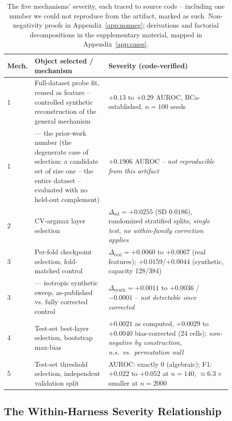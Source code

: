\documentclass{article}
\begin{document}
\begin{table}[t]
\centering
\small
{\setlength{\tabcolsep}{3pt}
\begin{tabular}{@{}p{0.04\linewidth}p{0.33\linewidth}p{0.55\linewidth}@{}}
\toprule
Mech. & Object selected / mechanism & Severity (code-verified) \\
\midrule
1 & Full-dataset probe fit, reused as feature -- controlled synthetic reconstruction of the general mechanism & $+0.13$ to $+0.29$ AUROC, BCa-established, $n{=}100$ seeds \\
1 & --- the prior-work number (the degenerate case of selection: a candidate set of size one -- the entire dataset -- evaluated with no held-out complement) & $+0.1906$ AUROC -- \emph{not reproducible from this artifact} \\
2 & CV-argmax layer selection & $\Delta_{\text{sel}}=+0.0255$ (SD $0.0186$), randomized stratified splits; \emph{single test, no within-family correction applies} \\
3 & Per-fold checkpoint selection, fold-matched control & $\Delta_{\text{real}}=+0.0060$ to $+0.0067$ (real features); $+0.0159$/$+0.0044$ (synthetic, capacity 128/384) \\
3 & --- isotropic synthetic sweep, as-published vs. fully corrected control & $\Delta_{\text{synth}}=+0.0011$ to $+0.0036$ / $-0.0001$ -- \emph{not detectable once corrected} \\
4 & Test-set best-layer selection, bootstrap max-bias & $+0.0021$ as computed, $+0.0029$ to $+0.0040$ bias-corrected (24 cells); \emph{non-negative by construction, n.s.\ vs.\ permutation null} \\
5 & Test-set threshold selection, independent validation split & AUROC: exactly $0$ (algebraic); F1: $+0.022$ to $+0.052$ at $n{=}140$, $\approx6.3\times$ smaller at $n{=}2000$ \\
\bottomrule
\end{tabular}}
\caption{The five mechanisms' severity, each traced to source code -- including
one number we could not reproduce from the artifact, marked as such.
Non-negativity proofs in
Appendix~\ref{app:nonneg}; derivations and factorial decompositions in the
supplementary material, mapped in Appendix~\ref{app:cases}.}
\label{tab:severity}
\end{table}

\subsection{The Within-Harness Severity Relationship}
\label{app:severity-detail}
\end{document}
